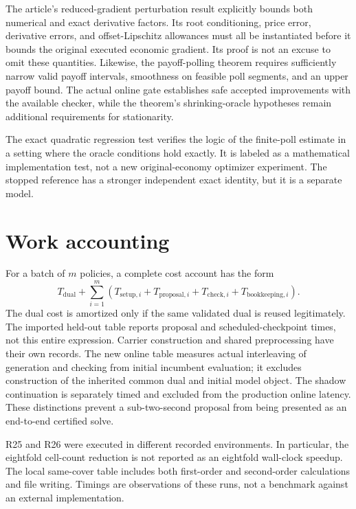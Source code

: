 The article's reduced-gradient perturbation result explicitly bounds both numerical and exact derivative factors. Its root conditioning, price error, derivative errors, and offset-Lipschitz allowances must all be instantiated before it bounds the original executed economic gradient. Its proof is not an excuse to omit these quantities. Likewise, the payoff-polling theorem requires sufficiently narrow valid payoff intervals, smoothness on feasible poll segments, and an upper payoff bound. The actual online gate establishes safe accepted improvements with the available checker, while the theorem's shrinking-oracle hypotheses remain additional requirements for stationarity.

The exact quadratic regression test verifies the logic of the finite-poll estimate in a setting where the oracle conditions hold exactly. It is labeled as a mathematical implementation test, not a new original-economy optimizer experiment. The stopped reference has a stronger independent exact identity, but it is a separate model.

\section{Work accounting}\label{supp:cost}
For a batch of $m$ policies, a complete cost account has the form
\[
 T_{\mathrm{dual}}+\sum_{i=1}^m(T_{\mathrm{setup},i}+T_{\mathrm{proposal},i}+T_{\mathrm{check},i}+T_{\mathrm{bookkeeping},i}).
\]
The dual cost is amortized only if the same validated dual is reused legitimately. The imported held-out table reports proposal and scheduled-checkpoint times, not this entire expression. Carrier construction and shared preprocessing have their own records. The new online table measures actual interleaving of generation and checking from initial incumbent evaluation; it excludes construction of the inherited common dual and initial model object. The shadow continuation is separately timed and excluded from the production online latency. These distinctions prevent a sub-two-second proposal from being presented as an end-to-end certified solve.

R25 and R26 were executed in different recorded environments. In particular, the eightfold cell-count reduction is not reported as an eightfold wall-clock speedup. The local same-cover table includes both first-order and second-order calculations and file writing. Timings are observations of these runs, not a benchmark against an external implementation.

